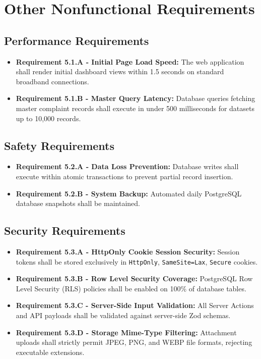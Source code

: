 \documentclass[12pt, a4paper]{article}
\begin{document}
\section{Other Nonfunctional Requirements}

\subsection{Performance Requirements}
\begin{itemize}[leftmargin=*]
    \item \textbf{Requirement 5.1.A - Initial Page Load Speed:} The web application shall render initial dashboard views within 1.5 seconds on standard broadband connections.
    \item \textbf{Requirement 5.1.B - Master Query Latency:} Database queries fetching master complaint records shall execute in under 500 milliseconds for datasets up to 10,000 records.
\end{itemize}

\subsection{Safety Requirements}
\begin{itemize}[leftmargin=*]
    \item \textbf{Requirement 5.2.A - Data Loss Prevention:} Database writes shall execute within atomic transactions to prevent partial record insertion.
    \item \textbf{Requirement 5.2.B - System Backup:} Automated daily PostgreSQL database snapshots shall be maintained.
\end{itemize}

\subsection{Security Requirements}
\begin{itemize}[leftmargin=*]
    \item \textbf{Requirement 5.3.A - HttpOnly Cookie Session Security:} Session tokens shall be stored exclusively in \texttt{HttpOnly}, \texttt{SameSite=Lax}, \texttt{Secure} cookies.
    \item \textbf{Requirement 5.3.B - Row Level Security Coverage:} PostgreSQL Row Level Security (RLS) policies shall be enabled on 100\% of database tables.
    \item \textbf{Requirement 5.3.C - Server-Side Input Validation:} All Server Actions and API payloads shall be validated against server-side Zod schemas.
    \item \textbf{Requirement 5.3.D - Storage Mime-Type Filtering:} Attachment uploads shall strictly permit JPEG, PNG, and WEBP file formats, rejecting executable extensions.
\end{itemize}
\end{document}
